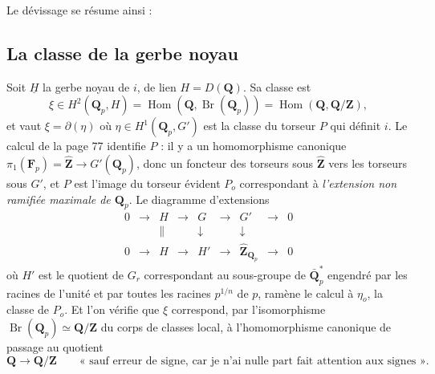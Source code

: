 \documentclass[11pt,a4paper]{article}
\begin{document}
Le dévissage se résume ainsi :


\subsection*{La classe de la gerbe noyau}

Soit $\underline{H}$ la gerbe noyau de $i$, de lien $H = D(\mathbf{Q})$. Sa
classe est
\[
\xi \in H^{2}(\mathbf{Q}_{p}, H)
= \operatorname{Hom}(\mathbf{Q}, \operatorname{Br}(\mathbf{Q}_{p}))
= \operatorname{Hom}(\mathbf{Q}, \mathbf{Q}/\mathbf{Z}) ,
\]
et vaut $\xi = \partial(\eta)$ où $\eta \in H^{1}(\mathbf{Q}_{p}, G')$ est la
classe du torseur $P$ qui définit $i$. Le calcul de la page 77 identifie $P$ :
il y a un homomorphisme canonique $\pi_{1}(\mathbf{F}_{p}) = \hat{\mathbf{Z}}
\to G'(\mathbf{Q}_{p})$, donc un foncteur des torseurs sous
$\hat{\mathbf{Z}}$ vers les torseurs sous $G'$, et $P$ est l'image du torseur
évident $P_{o}$ correspondant à \emph{l'extension non ramifiée maximale de
$\mathbf{Q}_{p}$}. Le diagramme d'extensions
\[
\begin{array}{ccccccccc}
0 &\to& H &\to& G &\to& G' &\to& 0 \\
 && \big\| && \downarrow && \downarrow && \\
0 &\to& H &\to& H' &\to& \hat{\mathbf{Z}}_{\mathbf{Q}_{p}} &\to& 0
\end{array}
\]
où $H'$ est le quotient de $G_{r}$ correspondant au sous-groupe de
$\bar{\mathbf{Q}}_{p}^{*}$ engendré par les racines de l'unité et par toutes
les racines $p^{1/n}$ de $p$, ramène le calcul à $\eta_{o}$, la classe de
$P_{o}$. Et l'on vérifie que $\xi$ correspond, par l'isomorphisme
$\operatorname{Br}(\mathbf{Q}_{p}) \simeq \mathbf{Q}/\mathbf{Z}$ du corps de
classes local, à l'homomorphisme canonique de passage au quotient
\[
\mathbf{Q} \longrightarrow \mathbf{Q}/\mathbf{Z}
\qquad
\text{« sauf erreur de signe, car je n'ai nulle part fait attention aux signes ».}
\]
\end{document}
